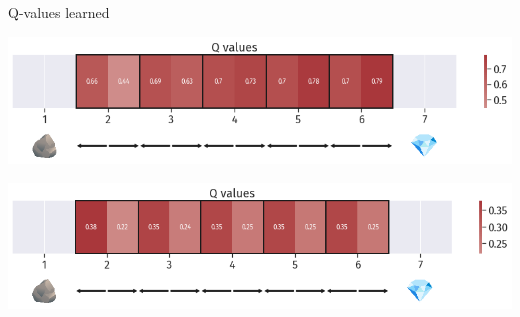\documentclass[bigger]{beamer}
\begin{document}
\begin{frame}[label={sec:orgd88bf50}]{Q-values learned}
\begin{center}
\includegraphics[width=\textwidth]{img/DRL-q-values.png}
\end{center}
\begin{center}
\includegraphics[width=\textwidth]{img/DRL-q-values2.png}
\end{center}
\end{frame}
\end{document}
